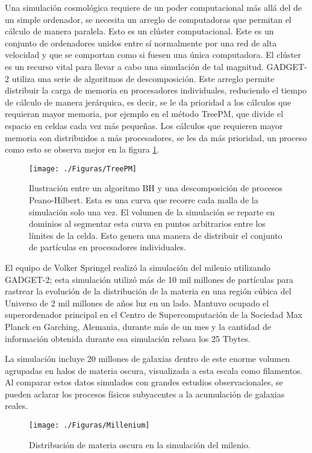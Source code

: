 \documentclass[a4paper,openright,12pt]{book}
\begin{document}
Una simulación cosmológica requiere de un poder computacional más allá del de un simple ordenador, se necesita un arreglo de computadoras que permitan el cálculo de manera paralela. Esto es un clúster computacional. Este es un conjunto de ordenadores unidos entre sí normalmente por una red de alta velocidad y que se comportan como si fuesen una única computadora. El clúster es un recurso vital para llevar a cabo una simulación de tal magnitud. GADGET-2 utiliza una serie de algoritmos de descomposición. Este arreglo permite distribuir la carga de memoria en procesadores individuales, reduciendo el tiempo de cálculo de manera jerárquica, es decir, se le da prioridad a los cálculos que requieran mayor memoria, por ejemplo en el método TreePM, que divide el espacio en celdas cada vez más pequeñas. Los cálculos que requieren mayor memoria son distribuidos a más procesadores, se les da más prioridad, un proceso como esto se observa mejor en la figura \ref{fig 3.1}.
\begin{figure}
\centering
  \texttt{[image: ./Figuras/TreePM]}
  \caption{\footnotesize{Ilustración entre un algoritmo BH y una descomposición de procesos Peano-Hilbert. Esta es una curva que recorre cada malla de la simulación solo una vez. El volumen de la simulación se reparte en dominios al segmentar esta curva en puntos arbitrarios entre los límites de la celda. Esto genera una manera de distribuir el conjunto de partículas en procesadores individuales.}}
  \label{fig 3.1}
\end{figure}

El equipo de Volker Springel realizó la simulación del milenio \cite{3.0.3}utilizando GADGET-2; esta simulación utilizó más de 10 mil millones de partículas para rastrear la evolución de la distribución de la materia en una región cúbica del Universo de 2 mil millones de años luz en un lado. Mantuvo ocupado el superordenador principal en el Centro de Supercomputación de la Sociedad Max Planck en Garching, Alemania, durante más de un mes y la cantidad de información obtenida durante esa simulación rebasa los 25 Tbytes.

La simulación incluye 20 millones de galaxias dentro de este enorme volumen agrupadas en halos de materia oscura, visualizada a esta escala como filamentos. Al comparar estos datos simulados con grandes estudios observacionales, se pueden aclarar los procesos físicos subyacentes a la acumulación de galaxias reales.

\begin{figure}
\centering
  \texttt{[image: ./Figuras/Millenium]}
  \caption{\footnotesize{Distribución de materia oscura en la simulación del milenio.}}
  \label{fig 3.2}
\end{figure}
\end{document}
